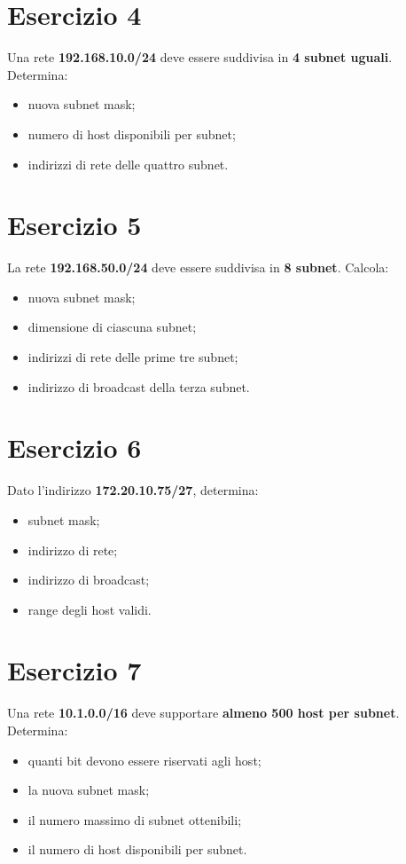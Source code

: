 \documentclass[a4paper,12pt]{article}
\begin{document}
\section*{Esercizio 4}
Una rete \textbf{192.168.10.0/24} deve essere suddivisa in \textbf{4 subnet uguali}. Determina:
\begin{itemize}
    \item nuova subnet mask;
    \item numero di host disponibili per subnet;
    \item indirizzi di rete delle quattro subnet.
\end{itemize}

\section*{Esercizio 5}
La rete \textbf{192.168.50.0/24} deve essere suddivisa in \textbf{8 subnet}. Calcola:
\begin{itemize}
    \item nuova subnet mask;
    \item dimensione di ciascuna subnet;
    \item indirizzi di rete delle prime tre subnet;
    \item indirizzo di broadcast della terza subnet.
\end{itemize}

\section*{Esercizio 6}
Dato l'indirizzo \textbf{172.20.10.75/27}, determina:
\begin{itemize}
    \item subnet mask;
    \item indirizzo di rete;
    \item indirizzo di broadcast;
    \item range degli host validi.
\end{itemize}

\section*{Esercizio 7}
Una rete \textbf{10.1.0.0/16} deve supportare \textbf{almeno 500 host per subnet}. Determina:
\begin{itemize}
    \item quanti bit devono essere riservati agli host;
    \item la nuova subnet mask;
    \item il numero massimo di subnet ottenibili;
    \item il numero di host disponibili per subnet.
\end{itemize}
\end{document}

